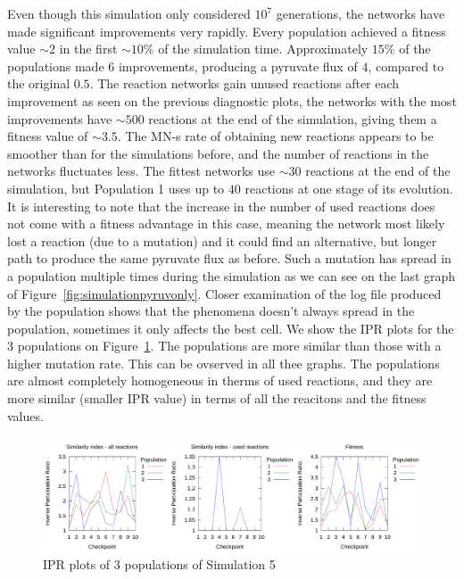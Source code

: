 \documentclass[a4paper,12pt]{article}
\begin{document}
Even though this simulation only considered $10^7$ generations, the networks have made significant improvements very rapidly. Every population achieved a fitness value $\sim 2$ in the first $\sim 10\%$ of the simulation time. Approximately $15\%$ of the populations made $6$ improvements, producing a pyruvate flux of $4$, compared to the original $0.5$. The reaction networks gain unused reactions after each improvement as seen on the previous diagnostic plots, the networks with the most improvements have $\sim 500$ reactions at the end of the simulation, giving them a fitness value of $\sim 3.5$. The MN-s rate of obtaining new reactions appears to be smoother than for the simulations before, and the number of reactions in the networks fluctuates less. The fittest networks use $\sim 30$ reactions at the end of the simulation, but Population 1 uses up to $40$ reactions at one stage of its evolution. It is interesting to note that the increase in the number of used reactions does not come with a fitness advantage in this case, meaning the network most likely lost a reaction (due to a mutation) and it could find an alternative, but longer path to produce the same pyruvate flux as before. Such a mutation has spread in a population multiple times during the simulation as we can see on the last graph of Figure~\ref{fig:simulationpyruvonly}. Closer examination of the log file produced by the population shows that the phenomena doesn't always spread in the population, sometimes it only affects the best cell. We show the IPR plots for the $3$ populations on Figure~\ref{fig:iprsim5}. The populations are more similar than those with a higher mutation rate. This can be ovserved in all thee graphs. The populations are almost completely homogeneous in therms of used reactions, and they are more similar (smaller IPR value) in terms of all the reacitons and the fitness values. 

\begin{figure}[htpb]
	\centering
	\includegraphics[width=1\linewidth]{iprsim5.pdf}
	\caption{IPR plots of 3 populations of Simulation 5}
	\label{fig:iprsim5}
\end{figure}
\end{document}
